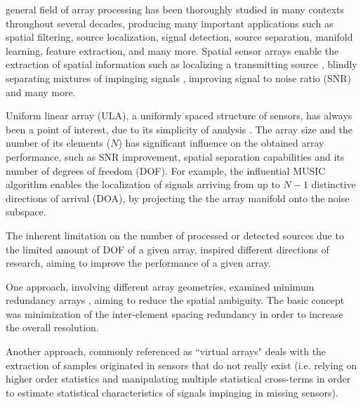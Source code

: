 general field of array processing has been thoroughly studied in many contexts throughout several decades, producing many important applications such as spatial filtering, source localization, signal detection, source separation, manifold learning, feature extraction, and many more.
Spatial sensor arrays enable the extraction of spatial information such as localizing a transmitting source \cite{skolnik2008radar} , blindly separating mixtures of impinging signals \cite{Comon1994IndependentConcept} , improving signal to noise ratio (SNR) \cite{Frost1972AProcessing,verdu1998multiuser} and many more. 
\par Uniform linear array (ULA), a uniformly spaced structure of sensors, has always been a point of interest, due to its simplicity of analysis \cite{VanTrees2002DetectionIV}. 
The array size and the number of its elements ($N$) has significant influence on the obtained array performance, such as SNR improvement, spatial separation capabilities and its number of degrees of freedom (DOF). For example, the influential MUSIC algorithm \cite{Ralph1986MultipleParameter} enables the localization of signals arriving from up to $N-1$ distinctive directions of arrival (DOA), by projecting the the array manifold onto the noise subspace.
\par The inherent limitation on the number of processed or detected sources due to the limited amount of DOF of a given array, inspired different directions of research, aiming to improve the performance of a given array.
\par One approach, involving different array geometries, examined minimum redundancy arrays \cite{Moffet1968Minimum-RedundancyArrays,Pillai1985AEstimation,UnnikrishnaPillai1987StatisticalMatrix}, aiming to reduce the spatial ambiguity. The basic concept was minimization of the inter-element spacing redundancy in order to increase the overall resolution. 
\par Another approach, commonly referenced as ``virtual arrays" \cite{Pal2010NestedFreedom,Chevalier2005OnProcessing,Mendel1999ApplicationsProcessing} deals with the extraction of samples originated in sensors that do not really exist (i.e. relying on higher order statistics and manipulating multiple statistical cross-terms in order to estimate statistical characteristics of signals impinging in missing sensors). 

